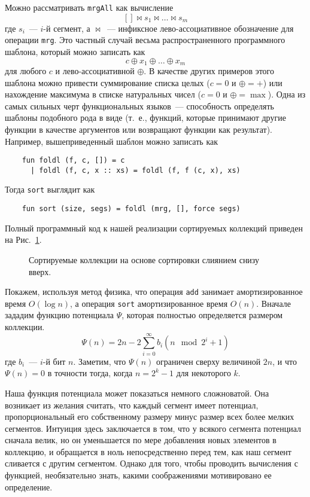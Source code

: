 \begin{remark}
  Можно рассматривать \lstinline!mrgAll! как вычисление
  $$
  [] \bowtie s_1 \bowtie \ldots \bowtie s_m
  $$
  где $s_i$~--- $i$-й сегмент, а $\bowtie$~--- инфиксное
  лево-ассоциативное обозначение для операции \lstinline!mrg!. Это частный случай весьма
  распространенного программного шаблона, который можно записать как
  $$
  c \oplus x_1 \oplus \ldots \oplus x_m
  $$
  для любого $c$ и лево-ассоциативной $\oplus$. В качестве других
  примеров этого шаблона можно привести суммирование списка целых ($c
  = 0$ и $\oplus = +$) или нахождение максимума в списке натуральных
  чисел ($c = 0$ и $\oplus = \max$). Одна из самых сильных черт
  функциональных языков~--- способность определять шаблоны подобного
  рода в виде 
  (т.~е., функций, которые принимают другие функции в качестве
  аргументов или возвращают функции как результат). Например,
  вышеприведенный шаблон можно записать как
  \begin{lstlisting}
    fun foldl (f, c, []) = c
      | foldl (f, c, x :: xs) = foldl (f, f (c, x), xs)
  \end{lstlisting}
  Тогда \lstinline!sort! выглядит как
  \begin{lstlisting}
    fun sort (size, segs) = foldl (mrg, [], force segs)
  \end{lstlisting}
\end{remark}
Полный программный код к нашей реализации сортируемых коллекций
приведен на Рис.~\ref{fig:6.5}.

\begin{figure}
  \centering

  \caption{Сортируемые коллекции на основе сортировки слиянием снизу вверх.}
  \label{fig:6.5}
\end{figure}

Покажем, используя метод физика, что операция \lstinline!add! занимает
амортизированное время $O(\log n)$, а операция \lstinline!sort!
амортизированное время $O(n)$.  Вначале зададим функцию потенциала
$\Psi$, которая полностью определяется размером коллекции.
$$
\Psi(n) = 2n - 2 \sum_{i=0}^{\infty} b_i (n \mod 2^i+1)
$$
где $b_i$~--- $i$-й бит $n$. Заметим, что $\Psi(n)$ ограничен сверху
величиной $2n$, и что $\Psi(n) = 0$ в точности тогда, когда $n = 2^k -
1$ для некоторого $k$.

\begin{remark}
  Наша функция потенциала может показаться немного сложноватой. Она
  возникает из желания считать, что каждый сегмент имеет потенциал,
  пропорциональный его собственному размеру минус размер всех более
  мелких сегментов. Интуиция здесь заключается в том, что у всякого
  сегмента потенциал сначала велик, но он уменьшается по мере
  добавления новых элементов в коллекцию, и обращается в ноль
  непосредственно перед тем, как наш сегмент сливается с другим
  сегментом. Однако для того, чтобы проводить вычисления с функцией,
  необязательно знать, какими соображениями мотивировано ее
  определение.
\end{remark}

